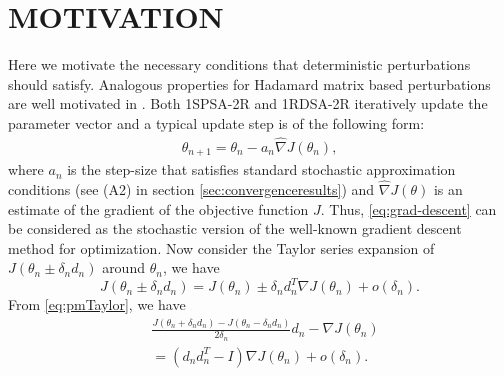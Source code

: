 \documentclass[letterpaper, 10 pt, conference]{ieeeconf}  %
\begin{document}
\section{MOTIVATION}
Here we motivate the necessary conditions that deterministic perturbations should satisfy.
Analogous properties for Hadamard matrix based perturbations are well motivated in 
\cite{bhatnagar-book}.
Both 1SPSA-2R and 1RDSA-2R iteratively update the parameter vector and a typical update step
is of the following form:
\begin{align}
\label{eq:grad-descent}
\theta_{n+1} = \theta_n - a_n \widehat\nabla J(\theta_n), 
\end{align}
where $a_n$ is the step-size that satisfies standard stochastic approximation 
conditions (see (A2) in section \ref{sec:convergenceresults}) and $\widehat\nabla 
J(\theta)$ is an estimate of the gradient of the objective function $J$.
Thus, \eqref{eq:grad-descent} can be considered as 
the stochastic version of the well-known gradient descent method for optimization. 
Now consider the Taylor series expansion of $J(\theta_n \pm \delta_nd_n)$ around
$\theta_n$, we have
 \begin{equation} \label{eq:pmTaylor}
 J(\theta_n \pm \delta_nd_n)=
 J(\theta_n) \pm \delta_nd_n^T \nabla J(\theta_n)+o(\delta_n).
\end{equation}
From \eqref{eq:pmTaylor}, we have
\begin{align}\label{eq:Taylor}
&\frac{J(\theta_n+\delta_n d_n)-J(\theta_n-\delta_n d_n)}{2\delta_n}d_n
 - \nabla J(\theta_n) \\
&= (d_nd_n^T-I)\nabla J(\theta_n)+o(\delta_n).
\end{align}
\end{document}
